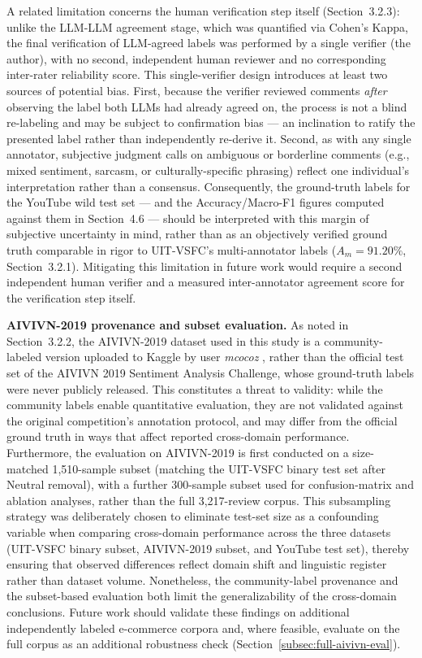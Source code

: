 \documentclass[12pt]{report} %
\begin{document}
A related limitation concerns the human verification step itself (Section~3.2.3): unlike the LLM-LLM agreement stage, which was quantified via Cohen's Kappa, the final verification of LLM-agreed labels was performed by a single verifier (the author), with no second, independent human reviewer and no corresponding inter-rater reliability score. This single-verifier design introduces at least two sources of potential bias. First, because the verifier reviewed comments \textit{after} observing the label both LLMs had already agreed on, the process is not a blind re-labeling and may be subject to confirmation bias --- an inclination to ratify the presented label rather than independently re-derive it. Second, as with any single annotator, subjective judgment calls on ambiguous or borderline comments (e.g., mixed sentiment, sarcasm, or culturally-specific phrasing) reflect one individual's interpretation rather than a consensus. Consequently, the ground-truth labels for the YouTube wild test set --- and the Accuracy/Macro-F1 figures computed against them in Section~4.6 --- should be interpreted with this margin of subjective uncertainty in mind, rather than as an objectively verified ground truth comparable in rigor to UIT-VSFC's multi-annotator labels ($A_m = 91.20\%$, Section~3.2.1). Mitigating this limitation in future work would require a second independent human verifier and a measured inter-annotator agreement score for the verification step itself.

\textbf{AIVIVN-2019 provenance and subset evaluation.}
As noted in Section~3.2.2, the AIVIVN-2019 dataset used in this study is a community-labeled version uploaded to Kaggle by user \textit{mcocoz} \cite{aivivn2019kaggle}, rather than the official test set of the AIVIVN 2019 Sentiment Analysis Challenge, whose ground-truth labels were never publicly released. This constitutes a threat to validity: while the community labels enable quantitative evaluation, they are not validated against the original competition's annotation protocol, and may differ from the official ground truth in ways that affect reported cross-domain performance. Furthermore, the evaluation on AIVIVN-2019 is first conducted on a size-matched 1,510-sample subset (matching the UIT-VSFC binary test set after Neutral removal), with a further 300-sample subset used for confusion-matrix and ablation analyses, rather than the full 3,217-review corpus. This subsampling strategy was deliberately chosen to eliminate test-set size as a confounding variable when comparing cross-domain performance across the three datasets (UIT-VSFC binary subset, AIVIVN-2019 subset, and YouTube test set), thereby ensuring that observed differences reflect domain shift and linguistic register rather than dataset volume. Nonetheless, the community-label provenance and the subset-based evaluation both limit the generalizability of the cross-domain conclusions. Future work should validate these findings on additional independently labeled e-commerce corpora and, where feasible, evaluate on the full corpus as an additional robustness check (Section~\ref{subsec:full-aivivn-eval}).
\end{document}
